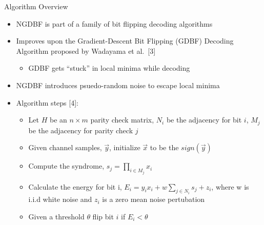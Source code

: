 \documentclass[10pt,ignorenonframetext,]{beamer}
\providecommand{\tightlist}{%
  \setlength{\itemsep}{0pt}\setlength{\parskip}{0pt}}
\begin{document}
\begin{frame}{Algorithm Overview}
\protect\hypertarget{algorithm-overview}{}
\begin{itemize}[<+->]
\tightlist
\item
  NGDBF is part of a family of bit flipping decoding algorithms
\item
  Improves upon the Gradient-Descent Bit Flipping (GDBF) Decoding
  Algorithm proposed by Wadayama et al.~{[}3{]}

  \begin{itemize}[<+->]
  \tightlist
  \item
    GDBF gets ``stuck'' in local minima while decoding
  \end{itemize}
\item
  NGDBF introduces psuedo-random noise to escape local minima
\item
  Algorithm steps {[}4{]}:

  \begin{itemize}[<+->]
  \tightlist
  \item
    Let \(H\) be an \(n\times m\) parity check matrix, \(N_i\) be the
    adjacency for bit \(i\), \(M_j\) be the adjacency for parity check
    \(j\)
  \item
    Given channel samples, \(\vec{y}\), initialize \(\vec{x}\) to be the
    \(sign(\vec{y})\)
  \item
    Compute the syndrome, \(s_j = \prod_{i\in M_j}x_i\)
  \item
    Calculate the energy for bit i,
    \(E_i = y_ix_i+w\sum_{j\in N_i}s_j + z_i\), where w is i.i.d white
    noise and \(z_i\) is a zero mean noise pertubation
  \item
    Given a threshold \(\theta\) flip bit \(i\) if \(E_i < \theta\)
  \end{itemize}
\end{itemize}
\end{frame}
\end{document}
